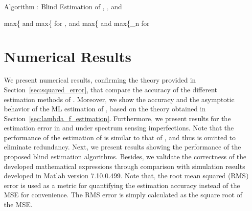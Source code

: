 \documentclass[11pt,draftclsnofoot,journal,onecolumn]{IEEEtran}
\begin{document}
\begin{algorithm}[t]
\centering
\caption{Algorithm : Blind Estimation of , , and }
\label{alg:estimation_wesam_2}
\begin{algorithmic}[1]
\REQUIRE 
\ENSURE max\{ and max\{ for , and max\{ and max\{\tilde{\lambda}_n for 
\ENDWHILE
{}
\ENDWHILE
\end{algorithmic}
\end{algorithm}

\section{Numerical Results}
\label{sec:numerical_results}

We present numerical results, confirming the theory provided in Section~\ref{sec:squared_error}, that compare the accuracy of the different estimation methods of . Moreover, we show the accuracy and the asymptotic behavior of the ML estimation of , based on the theory obtained in Section~\ref{sec:lambda_f_estimation}. Furthermore, we present results for the estimation error in  and  under spectrum sensing imperfections. Note that the performance of the estimation of  is similar to that of , and thus is omitted to eliminate redundancy. Next, we present results showing the performance of the proposed blind estimation algorithms. Besides, we validate the correctness of the developed mathematical expressions through comparison with simulation results developed in Matlab version 7.10.0.499. Note that, the root mean squared (RMS) error is used as a metric for quantifying the estimation accuracy instead of the MSE for convenience. The RMS error is simply calculated as the square root of the MSE. 
\end{document}

